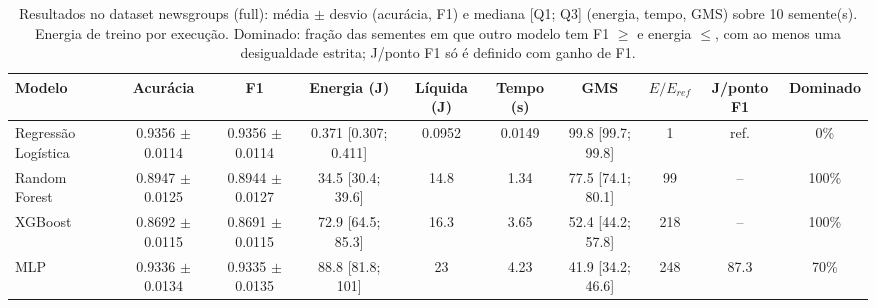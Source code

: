 \begin{table}[htbp]
\centering
\small
\caption{Resultados no dataset newsgroups (full): média $\pm$ desvio (acurácia, F1) e mediana [Q1; Q3] (energia, tempo, GMS) sobre 10 semente(s). Energia de treino por execução. Dominado: fração das sementes em que outro modelo tem F1 $\geq$ e energia $\leq$, com ao menos uma desigualdade estrita; J/ponto F1 só é definido com ganho de F1.}
\label{tab:resultados_newsgroups_full}
\begin{tabular}{lccccccccc}
\toprule
\textbf{Modelo} & \textbf{Acurácia} & \textbf{F1} & \textbf{Energia (J)} & \textbf{Líquida (J)} & \textbf{Tempo (s)} & \textbf{GMS} & \textbf{$E/E_{ref}$} & \textbf{J/ponto F1} & \textbf{Dominado} \\
\midrule
Regressão Logística & 0.9356 $\pm$ 0.0114 & 0.9356 $\pm$ 0.0114 & 0.371 [0.307; 0.411] & 0.0952 & 0.0149 & 99.8 [99.7; 99.8] & 1 & ref. & 0\% \\
Random Forest & 0.8947 $\pm$ 0.0125 & 0.8944 $\pm$ 0.0127 & 34.5 [30.4; 39.6] & 14.8 & 1.34 & 77.5 [74.1; 80.1] & 99 & -- & 100\% \\
XGBoost & 0.8692 $\pm$ 0.0115 & 0.8691 $\pm$ 0.0115 & 72.9 [64.5; 85.3] & 16.3 & 3.65 & 52.4 [44.2; 57.8] & 218 & -- & 100\% \\
MLP & 0.9336 $\pm$ 0.0134 & 0.9335 $\pm$ 0.0135 & 88.8 [81.8; 101] & 23 & 4.23 & 41.9 [34.2; 46.6] & 248 & 87.3 & 70\% \\
\bottomrule
\end{tabular}
\end{table}
